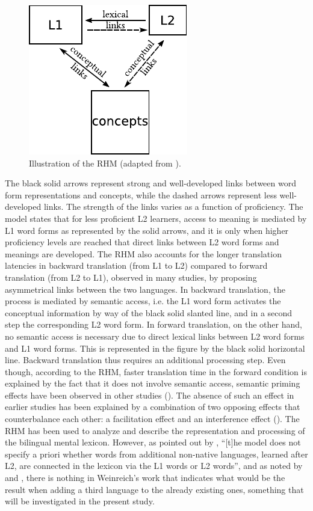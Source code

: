 \documentclass[output=paper,colorlinks,citecolor=brown,nonflat]{langsci/langscibook}
\begin{document}
\begin{figure}
    \includegraphics[height=.3\textheight]{figures/Gudmundson-fig1mod.pdf}
    \caption{Illustration of the RHM (adapted from \citealt{KrollStewart1994}).\label{fig:gudmundson:1}}
\end{figure}

The black solid arrows represent strong and well-developed links between word form representations and concepts, while the dashed arrows represent less well-developed links. The strength of the links varies as a function of proficiency. The model states that for less proficient L2 learners, access to meaning is mediated by L1 word forms as represented by the solid arrows, and it is only when higher proficiency levels are reached that direct links between L2 word forms and meanings are developed. The RHM also accounts for the longer translation latencies in backward translation (from L1 to L2) compared to forward translation (from L2 to L1), observed in many studies, by proposing asymmetrical links between the two languages. In backward translation, the process is mediated by semantic access, i.e. the L1 word form activates the conceptual information by way of the black solid slanted line, and in a second step the corresponding L2 word form. In forward translation, on the other hand, no semantic access is necessary due to direct lexical links between L2 word forms and L1 word forms. This is represented in the figure by the black solid horizontal line. Backward translation thus requires an additional processing step. Even though, according to the RHM, faster translation time in the forward condition is explained by the fact that it does not involve semantic access, semantic priming effects have been observed in other studies (\citealt{DuyckBrysbaert2002, SchoonbaertEtAl2009}). The absence of such an effect in earlier studies has been explained by a combination of two opposing effects that counterbalance each other: a facilitation effect and an interference effect (\citealt{WuJuffs2019}). The RHM has been used to analyze and describe the representation and processing of the bilingual mental lexicon. However, as pointed out by \citet[236]{GoralEtAl2006}, “[t]he model does not specify a priori whether words from additional non-native languages, learned after L2, are connected in the lexicon via the L1 words or L2 words”, and as noted by \citet{Singleton2003} and \citet{DeAngelis2007}, there is nothing in Weinreich’s work that indicates what would be the result when adding a third language to the already existing ones, something that will be investigated in the present study.
\end{document}
